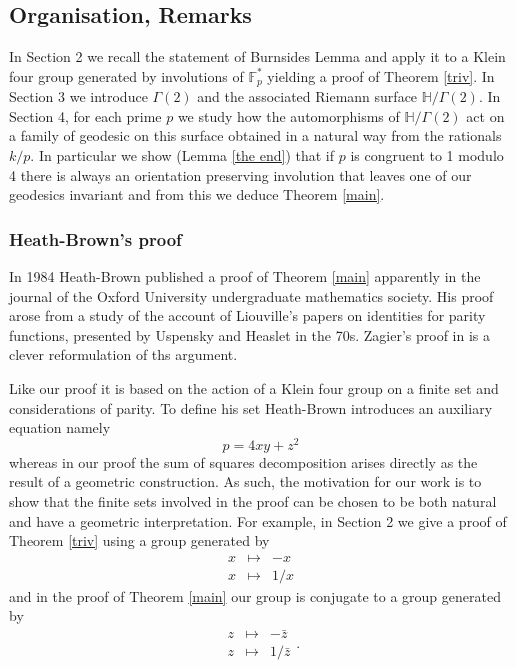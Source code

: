 \documentclass[12pt,a4paper]{amsart}
\def\HH{\mathbb{H}}
\def\xx{\HH/g2}
\def\fp{\mathbb{F}_p}
\def\g2{\Gamma(2)}
\def\xx{\HH/\g2}
\begin{document}
\subsection{Organisation, Remarks}

In Section 2 we recall the statement of Burnsides Lemma 
and apply it to a Klein four group generated by involutions of $\fp^*$
yielding a proof of Theorem \ref{triv}. In Section 3 we introduce $\g2$
and the associated Riemann surface $\xx$. 
In Section 4, for each prime $p$
we study how the automorphisms of $\xx$ 
act on a family of geodesic on this surface
obtained in a natural way from the rationals $k/p$.
In particular we show (Lemma \ref{the end})  that if $p$ is congruent to 1 modulo 4
there is always an orientation preserving involution that
leaves one of our geodesics invariant
and from this we deduce Theorem \ref{main}.

\subsubsection{Heath-Brown's proof}

In 1984 Heath-Brown published a proof of Theorem \ref{main}
apparently  in the journal of the Oxford University undergraduate mathematics society. 
His proof arose from a study of the account of Liouville’s papers on identities for parity functions, presented  by Uspensky and Heaslet in the 70s. Zagier's proof in \cite{zagier} is a clever reformulation of ths argument.

Like our  proof it is based on the action of a Klein four group 
on a finite set and considerations of parity.
To define his set Heath-Brown introduces an auxiliary equation namely
$$p = 4xy + z^2$$
whereas in our proof the sum of squares decomposition 
arises directly as the  result of a geometric construction.
As such, the motivation for our work is to show that 
the finite sets involved in the proof 
can be chosen to be both natural and have a geometric interpretation.
For example, in Section 2 we give a proof of Theorem \ref{triv}
using a group generated by 
$$ \begin{array}{lll}
x &\mapsto& -x \\
x &\mapsto& 1/x
\end{array}
$$
and in the proof of Theorem \ref{main}
our group is conjugate to a group generated by 
$$ \begin{array}{lll}
z &\mapsto& -\bar{z} \\
z &\mapsto& 1/\bar{z}
\end{array}.
$$
\end{document}
